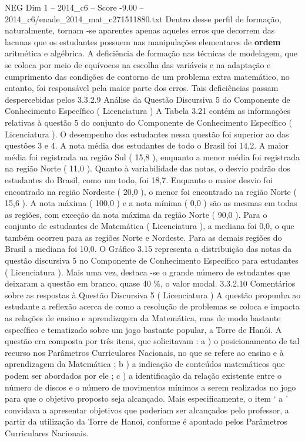 \begin{textsample}{NEG Dim 1 – 2014\_c6 – Score -9.00 – 2014\_c6/enade\_2014\_mat\_c271511880.txt}
Dentro desse perfil de formação, naturalmente, tornam -se aparentes apenas aqueles erros que decorrem das lacunas que os estudantes possuem nas manipulações elementares de \textbf{ordem} aritmética e algébrica.
A deficiência de formação nas técnicas de modelagem, que se coloca por meio de equívocos na escolha das variáveis e na adaptação e cumprimento das condições de contorno de um problema extra matemático, no entanto, foi responsável pela maior parte dos erros.
Tais deficiências passam despercebidas pelos 3.3.2.9 Análise da Questão Discursiva 5 do Componente de Conhecimento Específico ( Licenciatura ) A Tabela 3.21 contém as informações relativas à questão 5 do conjunto do Componente de Conhecimento Específico ( Licenciatura ).
O desempenho dos estudantes nessa questão foi superior ao das questões 3 e 4.
A nota média dos estudantes de todo o Brasil foi 14,2.
A maior média foi registrada na região Sul ( 15,8 ), enquanto a menor média foi registrada na região Norte ( 11,0 ).
Quanto à variabilidade das notas, o desvio padrão dos estudantes do Brasil, como um todo, foi 18,7.
Enquanto o maior desvio foi encontrado na região Nordeste ( 20,0 ), o menor foi encontrado na região Norte ( 15,6 ).
A nota máxima ( 100,0 ) e a nota mínima ( 0,0 ) são as mesmas em todas as regiões, com exceção da nota máxima da região Norte ( 90,0 ).
Para o conjunto de estudantes de Matemática ( Licenciatura ), a mediana foi 0,0, o que também ocorreu para as regiões Norte e Nordeste.
Para as demais regiões do Brasil a mediana foi 10,0.
O Gráfico 3.15 representa a distribuição das notas da questão discursiva 5 no Componente de Conhecimento Específico para estudantes ( Licenciatura ).
Mais uma vez, destaca -se o grande número de estudantes que deixaram a questão em branco, quase 40 \%, o valor modal. 3.3.2.10 Comentários sobre as respostas à Questão Discursiva 5 ( Licenciatura ) A questão propunha ao estudante a reflexão acerca de como a resolução de problemas se coloca e impacta as relações de ensino e aprendizagem da Matemática, mas de modo bastante específico e tematizado sobre um jogo bastante popular, a Torre de Hanói.
A questão era composta por três itens, que solicitavam : a ) o posicionamento de tal recurso nos Parâmetros Curriculares Nacionais, no que se refere ao ensino e à aprendizagem da Matemática ; b ) a indicação de conteúdos matemáticos que podem ser abordados por ele ; c ) a identificação da relação existente entre o número de discos e o número de movimentos mínimos a serem realizados no jogo para que o objetivo proposto seja alcançado.
Mais especificamente, o item ‘ a ’ convidava a apresentar objetivos que poderiam ser alcançados pelo professor, a partir da utilização da Torre de Hanoi, conforme é apontado pelos Parâmetros Curriculares Nacionais.

\end{textsample}
